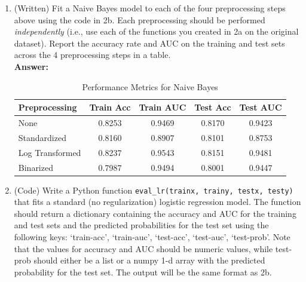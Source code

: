 \documentclass[a4paper,12pt]{article}
\begin{document}
\begin{enumerate}
\begin{enumerate}
        \item[(c)] (Written) Fit a Naive Bayes model to each of the four preprocessing steps above using the code in 2b. Each preprocessing should be performed \textit{independently} (i.e., use each of the functions you created in 2a on the original dataset). Report the accuracy rate and AUC on the training and test sets across the 4 preprocessing steps in a table. \\
        \textbf{Answer:}
        \begin{table}[h]
        \centering
        \begin{tabular}{|l|c|c|c|c|}
        \hline
        \textbf{Preprocessing} & \textbf{Train Acc} & \textbf{Train AUC} & \textbf{Test Acc} & \textbf{Test AUC} \\
        \hline
        None & 0.8253 & 0.9469 & 0.8170 & 0.9423 \\
        Standardized & 0.8160 & 0.8907 & 0.8101 & 0.8753 \\
        Log Transformed & 0.8237 & 0.9543 & 0.8151 & 0.9481 \\
        Binarized & 0.7987 & 0.9494 & 0.8001 & 0.9447 \\
        \hline
        \end{tabular}
        \caption{Performance Metrics for Naive Bayes}
        \end{table}
        
        \item[(d)] (Code) Write a Python function \texttt{eval\_lr(trainx, trainy, testx, testy)} that fits a standard (no regularization) logistic regression model. The function should return a dictionary containing the accuracy and AUC for the training and test sets and the predicted probabilities for the test set using the following keys: `train-acc', `train-auc', `test-acc', `test-auc', `test-prob'. Note that the values for accuracy and AUC should be numeric values, while test-prob should either be a list or a numpy 1-d array with the predicted probability for the test set. The output will be the same format as 2b.
        

\end{enumerate}
\end{enumerate}
\end{document}
